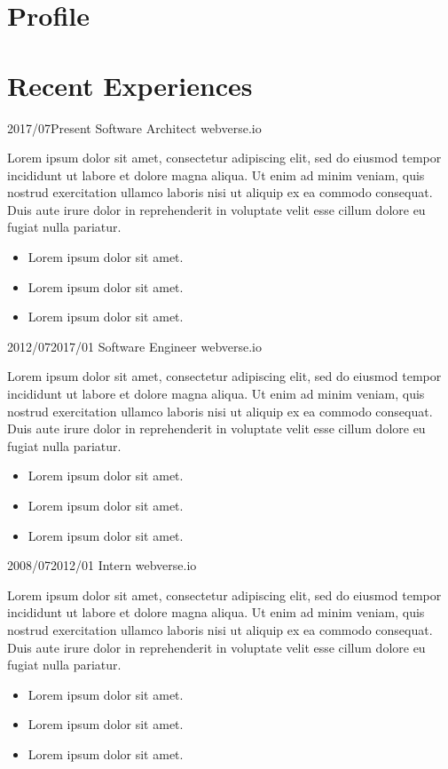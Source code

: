 \documentclass[]{cvone}
\begin{document}

\section{Profile}
\sectiontext{\textcolor{customgrey}{
    \lipsum[1]
}}

\noindent
\begin{minipage}[t]{0.7\linewidth}
  \section{Recent Experiences}
  \employmentitem
      {2017/07}{Present}
      {Software Architect}
      {webverse.io}
      {Lorem ipsum dolor sit amet, \textcolor{customorange}{consectetur adipiscing elit}, sed do eiusmod tempor incididunt ut labore et dolore magna aliqua. Ut enim ad minim veniam, quis nostrud exercitation ullamco laboris nisi ut aliquip ex ea commodo consequat. Duis aute irure dolor in reprehenderit in voluptate velit esse cillum dolore eu fugiat nulla pariatur.
        \begin{itemize}
          \item Lorem ipsum dolor sit amet.
          \item Lorem ipsum dolor sit amet.
          \item Lorem ipsum dolor sit amet.
        \end{itemize}
      }
  \employmentitem
      {2012/07}{2017/01}
      {Software Engineer}
      {webverse.io}
      {Lorem ipsum dolor sit amet, consectetur adipiscing elit, sed do eiusmod tempor incididunt ut labore et dolore magna aliqua. Ut enim ad minim veniam, quis nostrud exercitation \textcolor{customorange}{ullamco laboris nisi ut aliquip} ex ea commodo consequat. Duis aute irure dolor in reprehenderit in voluptate velit esse cillum dolore eu fugiat nulla pariatur.
        \begin{itemize}
          \item Lorem ipsum dolor sit amet.
          \item Lorem ipsum dolor sit amet.
          \item Lorem ipsum dolor sit amet.
        \end{itemize}
      }
  \employmentitem
      {2008/07}{2012/01}
      {Intern}
      {webverse.io}
      {\textcolor{customorange}{Lorem ipsum dolor sit amet}, consectetur adipiscing elit, sed do eiusmod tempor incididunt ut labore et dolore magna aliqua. Ut enim ad minim veniam, quis nostrud exercitation ullamco laboris nisi ut aliquip ex ea commodo consequat. Duis aute irure dolor in reprehenderit in voluptate velit esse cillum dolore eu fugiat nulla pariatur.
        \begin{itemize}
          \item Lorem ipsum dolor sit amet.
          \item Lorem ipsum dolor sit amet.
          \item Lorem ipsum dolor sit amet.
        \end{itemize}
      }
\end{minipage}
\end{document}
